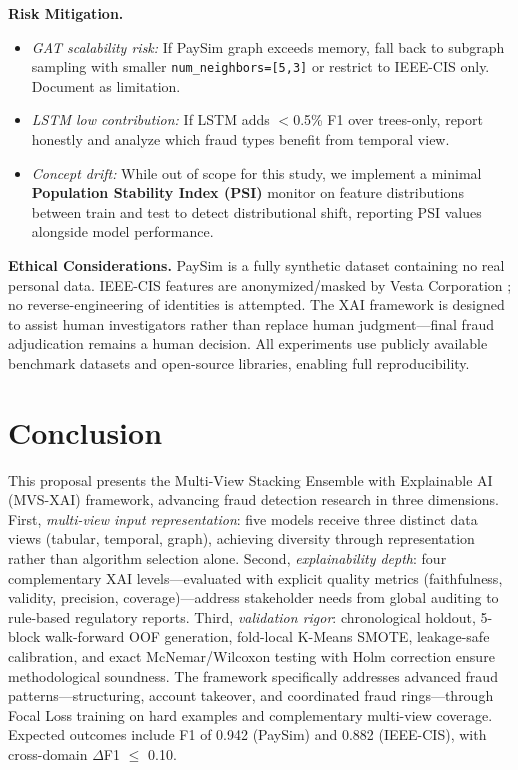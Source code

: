 \documentclass[10pt,a4paper,twocolumn]{article}
\begin{document}
\textbf{Risk Mitigation.}
\begin{itemize}[nosep]
    \item \emph{GAT scalability risk:} If PaySim graph exceeds memory, fall back to subgraph sampling with smaller \texttt{num\_neighbors=[5,3]} or restrict to IEEE-CIS only. Document as limitation.
    \item \emph{LSTM low contribution:} If LSTM adds $<$0.5\% F1 over trees-only, report honestly and analyze which fraud types benefit from temporal view.
    \item \emph{Concept drift:} While out of scope for this study, we implement a minimal \textbf{Population Stability Index (PSI)} monitor on feature distributions between train and test to detect distributional shift, reporting PSI values alongside model performance.
\end{itemize}

\textbf{Ethical Considerations.} PaySim is a fully synthetic dataset \cite{lopezrojas2016} containing no real personal data. IEEE-CIS features are anonymized/masked by Vesta Corporation \cite{ieee2019}; no reverse-engineering of identities is attempted. The XAI framework is designed to assist human investigators rather than replace human judgment---final fraud adjudication remains a human decision. All experiments use publicly available benchmark datasets and open-source libraries, enabling full reproducibility.

\section{Conclusion}

This proposal presents the Multi-View Stacking Ensemble with Explainable AI (MVS-XAI) framework, advancing fraud detection research in three dimensions. First, \emph{multi-view input representation}: five models receive three distinct data views (tabular, temporal, graph), achieving diversity through representation rather than algorithm selection alone. Second, \emph{explainability depth}: four complementary XAI levels---evaluated with explicit quality metrics (faithfulness, validity, precision, coverage)---address stakeholder needs from global auditing to rule-based regulatory reports. Third, \emph{validation rigor}: chronological holdout, 5-block walk-forward OOF generation, fold-local K-Means SMOTE, leakage-safe calibration, and exact McNemar/Wilcoxon testing with Holm correction ensure methodological soundness. The framework specifically addresses advanced fraud patterns---structuring, account takeover, and coordinated fraud rings---through Focal Loss training on hard examples and complementary multi-view coverage. Expected outcomes include F1 of 0.942 (PaySim) and 0.882 (IEEE-CIS), with cross-domain $\Delta$F1 $\leq$ 0.10.
\end{document}

